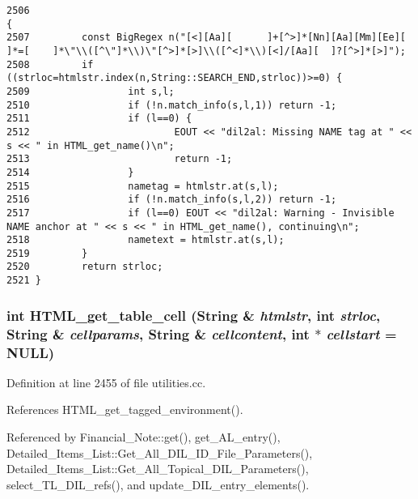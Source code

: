 \footnotesize\begin{verbatim}2506                                                                                      {
2507         const BigRegex n("[<][Aa][      ]+[^>]*[Nn][Aa][Mm][Ee][        ]*=[    ]*\"\\([^\"]*\\)\"[^>]*[>]\\([^<]*\\)[<]/[Aa][  ]?[^>]*[>]");
2508         if ((strloc=htmlstr.index(n,String::SEARCH_END,strloc))>=0) {
2509                 int s,l;
2510                 if (!n.match_info(s,l,1)) return -1;
2511                 if (l==0) {
2512                         EOUT << "dil2al: Missing NAME tag at " << s << " in HTML_get_name()\n";
2513                         return -1;
2514                 }
2515                 nametag = htmlstr.at(s,l);
2516                 if (!n.match_info(s,l,2)) return -1;
2517                 if (l==0) EOUT << "dil2al: Warning - Invisible NAME anchor at " << s << " in HTML_get_name(), continuing\n";
2518                 nametext = htmlstr.at(s,l);
2519         }
2520         return strloc;
2521 }
\end{verbatim}\normalsize 
{}
\subsubsection{\setlength{\rightskip}{0pt plus 5cm}int HTML\_\-get\_\-table\_\-cell ({\bf String} \& {\em htmlstr}, int {\em strloc}, {\bf String} \& {\em cellparams}, {\bf String} \& {\em cellcontent}, int $\ast$ {\em cellstart} = NULL)}\label{dil2al_8hh_a253}




Definition at line 2455 of file utilities.cc.

References HTML\_\-get\_\-tagged\_\-environment().

Referenced by Financial\_\-Note::get(), get\_\-AL\_\-entry(), Detailed\_\-Items\_\-List::Get\_\-All\_\-DIL\_\-ID\_\-File\_\-Parameters(), Detailed\_\-Items\_\-List::Get\_\-All\_\-Topical\_\-DIL\_\-Parameters(), select\_\-TL\_\-DIL\_\-refs(), and update\_\-DIL\_\-entry\_\-elements().



